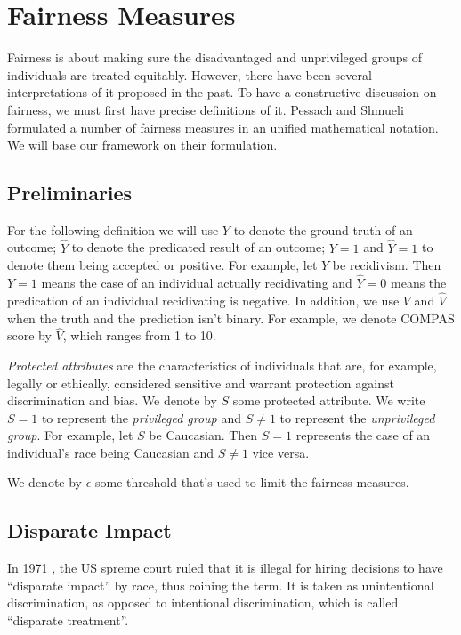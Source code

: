 \documentclass[conference]{IEEEtran}
\begin{document}
\section{Fairness Measures}
\label{sec:measures}
Fairness is about making sure the disadvantaged and unprivileged groups of individuals are treated equitably. However, there have been several interpretations of it proposed in the past. To have a constructive discussion on fairness, we must first have precise definitions of it. Pessach and Shmueli \cite{pessach2022review} formulated a number of fairness measures in an unified mathematical notation. We will base our framework on their formulation.

\subsection{Preliminaries}
For the following definition we will use $Y$ to denote the ground truth of an outcome; $\hat{Y}$ to denote the predicated result of an outcome; $Y = 1$ and $\hat{Y} = 1$ to denote them being accepted or positive. For example, let $Y$ be recidivism. Then $Y = 1$ means the case of an individual actually recidivating and $\hat{Y} = 0$ means the predication of an individual recidivating is negative. In addition, we use $V$ and $\hat{V}$ when the truth and the prediction isn't binary. For example, we denote COMPAS score by $\hat{V}$, which ranges from 1 to 10.

\emph{Protected attributes} are the characteristics of individuals that are, for example, legally or ethically, considered sensitive and warrant protection against discrimination and bias. We denote by $S$ some protected attribute. We write $S = 1$ to represent the \emph{privileged group} and $S \neq 1$ to represent the \emph{unprivileged group}. For example, let $S$ be Caucasian. Then $S = 1$ represents the case of an individual's race being Caucasian and $S \neq 1$ vice versa.

We denote by $\epsilon$ some threshold that's used to limit the fairness measures.

\subsection{Disparate Impact}
In 1971 \cite{griggs1971}, the US spreme court ruled that it is illegal for hiring decisions to have  ``disparate impact'' by race, thus coining the term. It is taken as unintentional discrimination, as opposed to intentional discrimination, which is called ``disparate treatment''.
\end{document}
